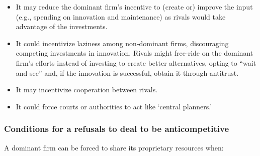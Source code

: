             \begin{itemize}
                \item It may reduce the dominant firm’s incentive to (create or) improve the input (e.g., spending on innovation and maintenance) as rivals would take advantage of the investments.
                \item It could incentivize laziness among non-dominant firms, discouraging competing investments in innovation. Rivals might free-ride on the dominant firm’s efforts instead of investing to create better alternatives, opting to “wait and see” and, if the innovation is successful, obtain it through antitrust.
                \item It may incentivize cooperation between rivals.
                \item It could force courts or authorities to act like ‘central planners.’
            \end{itemize}

        \subsubsection{Conditions for a refusals to deal to be anticompetitive}

            A dominant firm can be forced to share its proprietary resources when:
            
